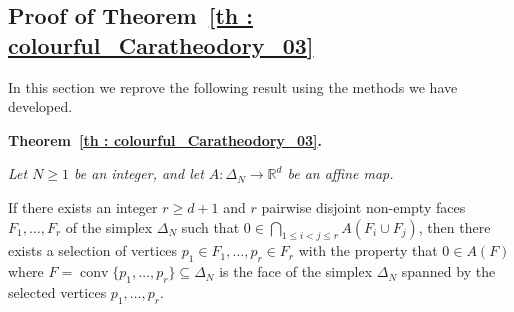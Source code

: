 \documentclass[a4paper,11pt,reqno, english]{amsart}
\theoremstyle{definition}
\theoremstyle{remark}
\newcommand\R{\mathbb R}
\DeclareMathOperator{\conv}{\mathrm{conv}}
\begin{document}
\subsection{Proof of Theorem~\ref{th : colourful_Caratheodory_03}}
\label{subsec : colourful Caratheodory's theorem 03}
\medskip


In this section we reprove the following result using the methods we have developed.

\medskip\noindent
{\bf Theorem~\ref{th : colourful_Caratheodory_03}.}
{\em
	Let $N\geq 1$ be an integer, and let $A\colon \Delta_N\longrightarrow\R^d$ be an affine map.

	\smallskip\noindent
	If there exists an integer $r\geq d+1$ and $r$ pairwise disjoint non-empty faces $F_1,\dots, F_{r}$ of the simplex $\Delta_N$ such that
	$
		0\in \bigcap_{1\leq i<j\leq r} A(F_i\cup F_j)
	$,
	then there exists a selection of vertices $p_1\in F_1,\dots, p_r\in F_r$ with the property that $0\in A(F)$ where $F=\conv\{p_1,\dots,p_r\}\subseteq\Delta_N$ is the face of the simplex $\Delta_N$ spanned by the selected vertices  $p_1,\dots,p_r$.}
\end{document}
